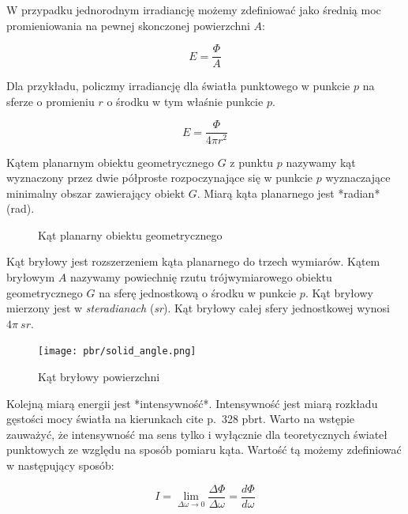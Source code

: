 \documentclass[../main.tex]{subfiles}
\begin{document}
W przypadku jednorodnym irradiancję możemy zdefiniować jako średnią moc
promieniowania na pewnej skonczonej powierzchni $A$:

$$
E = \frac{\Phi}{A}
$$

Dla przykładu, policzmy irradiancję dla światła punktowego w punkcie $p$ na
sferze o promieniu $r$ o środku w tym właśnie punkcie $p$.

$$ E = \frac{\Phi}{4 \pi r^2} $$

Kątem planarnym obiektu geometrycznego $G$ z punktu $p$ nazywamy kąt wyznaczony
przez dwie półproste rozpoczynające się w punkcie $p$ wyznaczające minimalny
obszar zawierający obiekt $G$. Miarą kąta planarnego jest *radian* (rad).

\begin{figure}[ht]
  \centering
  \caption{Kąt planarny obiektu geometrycznego}
  \label{fig:PlanarAngle}
\end{figure}

Kąt bryłowy jest rozszerzeniem kąta planarnego do trzech wymiarów. Kątem
bryłowym $A$ nazywamy powiechnię rzutu trójwymiarowego obiektu geometrycznego
$G$ na sferę jednostkową o środku w punkcie $p$. Kąt bryłowy mierzony jest w
\textit{steradianach} (\textit{sr}). Kąt bryłowy całej sfery jednostkowej
wynosi
  $4\pi \:{sr}$.

\begin{figure}[ht]
  \centering
  \texttt{[image: pbr/solid\_angle.png]}
  \caption{Kąt bryłowy powierzchni}
  \label{fig:SolidAngle}
\end{figure}

Kolejną miarą energii jest *intensywność*. Intensywność jest miarą rozkładu
gęstości mocy światła na kierunkach cite p.~328 pbrt. Warto na wstępie
zauważyć, że intensywność ma sens tylko i wyłącznie dla teoretycznych świateł
punktowych ze względu na sposób pomiaru kąta. Wartość tą możemy zdefiniować w
następujący sposób:

$$
I = \lim_{\Delta\omega \rightarrow 0} {
    \frac{\Delta\Phi}{\Delta\omega}
} = \frac{d\Phi}{d\omega}
$$
\end{document}
